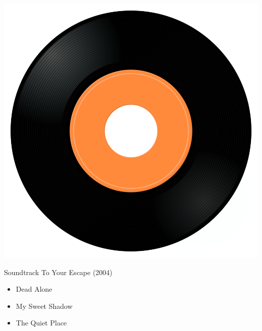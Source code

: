 \begin{minipage}[t]{0.25\textwidth}\vspace{0pt}
\captionsetup{type=figure}
\includegraphics[width=\textwidth]{Images/cover.png}
\caption*{Soundtrack To Your Escape (2004)}
\end{minipage}
\begin{minipage}[t]{0.25\textwidth}\vspace{0pt}
\begin{itemize}[nosep,leftmargin=1em,labelwidth=*,align=left]
	\setlength{\itemsep}{0pt}
	\item Dead Alone
	\item My Sweet Shadow
	\item The Quiet Place
\end{itemize}
\end{minipage}
